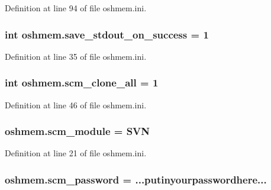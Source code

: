 Definition at line 94 of file oshmem.\-ini.

\hypertarget{namespaceoshmem_aa4302b1909a7fd535f1aed0eafc49776}{
\subsubsection[{save\-\_\-stdout\-\_\-on\-\_\-success}]{\setlength{\rightskip}{0pt plus 5cm}int oshmem.\-save\-\_\-stdout\-\_\-on\-\_\-success = 1}}\label{namespaceoshmem_aa4302b1909a7fd535f1aed0eafc49776}


Definition at line 35 of file oshmem.\-ini.

\hypertarget{namespaceoshmem_ae0365fee7a20801ce1c88902720271c8}{
\subsubsection[{scm\-\_\-clone\-\_\-all}]{\setlength{\rightskip}{0pt plus 5cm}int oshmem.\-scm\-\_\-clone\-\_\-all = 1}}\label{namespaceoshmem_ae0365fee7a20801ce1c88902720271c8}


Definition at line 46 of file oshmem.\-ini.

\hypertarget{namespaceoshmem_ab8796141a8629f1cfaedd19737a327c4}{
\subsubsection[{scm\-\_\-module}]{\setlength{\rightskip}{0pt plus 5cm}oshmem.\-scm\-\_\-module = S\-V\-N}}\label{namespaceoshmem_ab8796141a8629f1cfaedd19737a327c4}


Definition at line 21 of file oshmem.\-ini.

\hypertarget{namespaceoshmem_ae1917e76294cc8388c1a9077bf49f9a1}{
\subsubsection[{scm\-\_\-password}]{\setlength{\rightskip}{0pt plus 5cm}oshmem.\-scm\-\_\-password = ...putinyourpasswordhere...}}\label{namespaceoshmem_ae1917e76294cc8388c1a9077bf49f9a1}


